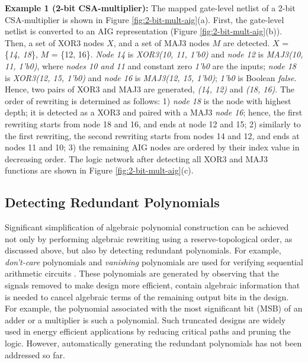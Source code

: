 \textbf{Example 1 (2-bit CSA-multiplier):} The mapped gate-level netlist of a 2-bit CSA-multiplier is shown in Figure \ref{fig:2-bit-mult-aig}(a). First, the gate-level netlist is converted to an AIG representation (Figure \ref{fig:2-bit-mult-aig}(b)). Then, a set of XOR3 nodes $X$, and a set of MAJ3 nodes $M$ are detected. $X$ = \{\textit{14, 18}\}, $M$ = \{12, 16\}. \textit{Node 14} is \textit{XOR3(10, 11, 1'b0)} and \textit{node 12} is \textit{MAJ3(10, 11, 1'b0)}, where \textit{nodes 10 and 11} and constant zero \textit{1'b0} are the inputs; \textit{node 18} is \textit{XOR3(12, 15, 1'b0)} and \textit{node 16} is \textit{MAJ3(12, 15, 1'b0)}; \textit{1'b0} is Boolean \textit{false}. Hence, two pairs of XOR3 and MAJ3 are generated, \textit{(14, 12)} and \textit{(18, 16)}. The order of rewriting is determined as follows: 1) \textit{node 18} is the node with highest depth; it is detected as a XOR3 and paired with a MAJ3 \textit{node 16}; hence, the first rewriting starts from node 18 and 16, and ends at node 12 and 15; 2) similarly to the first rewriting, the second rewriting starts from nodes 14 and 12, and ends at nodes 11 and 10; 3) the remaining AIG nodes are ordered by their index value in decreasing order. The logic network after detecting all XOR3 and MAJ3 functions are shown in Figure \ref{fig:2-bit-mult-aig}(c). %


\subsection{Detecting Redundant Polynomials}

Significant simplification of algebraic polynomial construction can be achieved not only by performing algebraic rewriting using a reserve-topological order, as discussed above, but also by detecting redundant polynomials. For example, \textit{don't-care} polynomials and \textit{vanishing} polynomials are used for verifying sequential arithmetic circuits \cite{yu-isvlsi-16a}. These polynomials are generated by observing that the signals removed to make design more efficient, contain algebraic information that is needed to cancel algebraic terms of the remaining output bits in the design. For example, the polynomial associated with the most significant bit (MSB) of an adder or a multiplier is such a polynomial. Such truncated designs are widely used in energy efficient applications by reducing critical paths and pruning the logic. However, automatically generating the redundant polynomials has not been addressed so far. 
%


